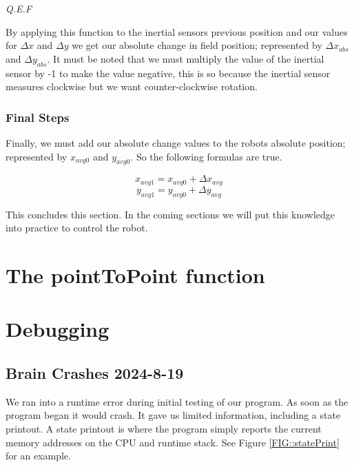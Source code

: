 \documentclass[12pt]{article}
\begin{document}
\textit{Q.E.F}

By applying this function to the inertial sensors previous position and our values for $\Delta x$ and $\Delta y$ we get our absolute change in field position; represented by $\Delta x_{abs}$ and $\Delta y_{abs}$. It must be noted that we must multiply the value of the inertial sensor by -1 to make the value negative, this is so because the inertial sensor measures clockwise but we want counter-clockwise rotation.

\subsubsection{Final Steps}
Finally, we must add our absolute change values to the robots absolute position; represented by $x_{avg0}$ and $y_{avg0}$. So the following formulas are true.

$$x_{avg1} = x_{avg0} + \Delta x_{avg}$$
$$y_{avg1} = y_{avg0} + \Delta y_{avg}$$

This concludes this section. In the coming sections we will put this knowledge into practice to control the robot.

\section{The pointToPoint function}

\section{Debugging}

\subsection{Brain Crashes 2024-8-19}
We ran into a runtime error during initial testing of our program. As soon as the program began it would crash. It gave us limited information, including a state printout. A state printout is where the program simply reports the current memory addresses on the CPU and runtime stack. See Figure \ref{FIG::statePrint} for an example.
\end{document}
